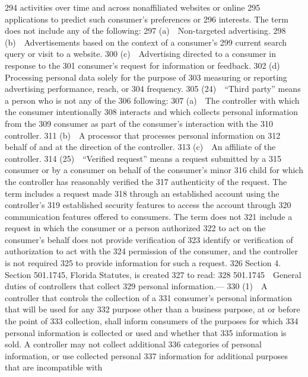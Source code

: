  294  activities over time and across nonaffiliated websites or online
  295  applications to predict such consumer’s preferences or
  296  interests. The term does not include any of the following:
  297         (a) Non-targeted advertising.
  298         (b) Advertisements based on the context of a consumer’s
  299  current search query or visit to a website.
  300         (c) Advertising directed to a consumer in response to the
  301  consumer’s request for information or feedback.
  302         (d) Processing personal data solely for the purpose of
  303  measuring or reporting advertising performance, reach, or
  304  frequency.
  305         (24) “Third party” means a person who is not any of the
  306  following:
  307         (a) The controller with which the consumer intentionally
  308  interacts and which collects personal information from the
  309  consumer as part of the consumer’s interaction with the
  310  controller.
  311         (b) A processor that processes personal information on
  312  behalf of and at the direction of the controller.
  313         (c) An affiliate of the controller.
  314         (25) “Verified request” means a request submitted by a
  315  consumer or by a consumer on behalf of the consumer’s minor
  316  child for which the controller has reasonably verified the
  317  authenticity of the request. The term includes a request made
  318  through an established account using the controller’s
  319  established security features to access the account through
  320  communication features offered to consumers. The term does not
  321  include a request in which the consumer or a person authorized
  322  to act on the consumer’s behalf does not provide verification of
  323  identify or verification of authorization to act with the
  324  permission of the consumer, and the controller is not required
  325  to provide information for such a request.
  326         Section 4. Section 501.1745, Florida Statutes, is created
  327  to read:
  328         501.1745 General duties of controllers that collect
  329  personal information.—
  330         (1) A controller that controls the collection of a
  331  consumer’s personal information that will be used for any
  332  purpose other than a business purpose, at or before the point of
  333  collection, shall inform consumers of the purposes for which
  334  personal information is collected or used and whether that
  335  information is sold. A controller may not collect additional
  336  categories of personal information, or use collected personal
  337  information for additional purposes that are incompatible with
